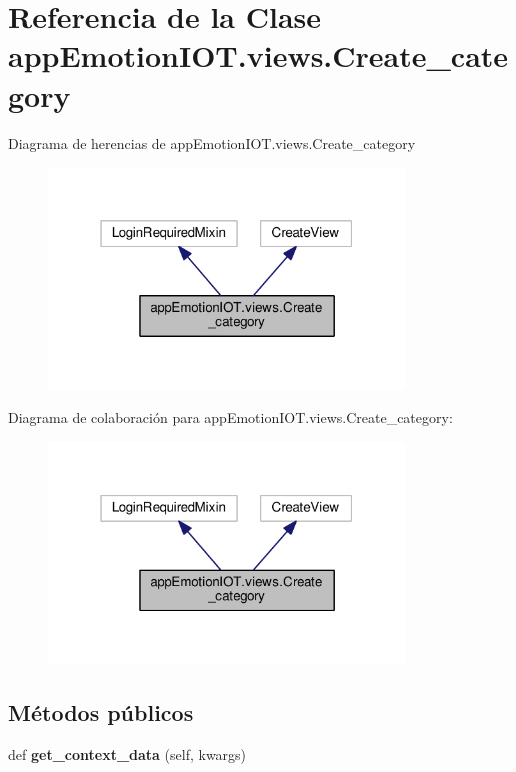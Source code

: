 \hypertarget{classappEmotionIOT_1_1views_1_1Create__category}{}\section{Referencia de la Clase app\+Emotion\+I\+O\+T.\+views.\+Create\+\_\+category}
\label{classappEmotionIOT_1_1views_1_1Create__category}


Diagrama de herencias de app\+Emotion\+I\+O\+T.\+views.\+Create\+\_\+category
\nopagebreak
\begin{figure}[H]
\begin{center}
\leavevmode
\includegraphics[width=268pt]{classappEmotionIOT_1_1views_1_1Create__category__inherit__graph}
\end{center}
\end{figure}


Diagrama de colaboración para app\+Emotion\+I\+O\+T.\+views.\+Create\+\_\+category\+:
\nopagebreak
\begin{figure}[H]
\begin{center}
\leavevmode
\includegraphics[width=268pt]{classappEmotionIOT_1_1views_1_1Create__category__coll__graph}
\end{center}
\end{figure}
\subsection*{Métodos públicos}
\begin{DoxyCompactItemize}
\item 
def {\bfseries get\+\_\+context\+\_\+data} (self, kwargs)\hypertarget{classappEmotionIOT_1_1views_1_1Create__category_a7c6bdb6b280a720d49b3fb0e97b6f095}{}\label{classappEmotionIOT_1_1views_1_1Create__category_a7c6bdb6b280a720d49b3fb0e97b6f095}

\end{DoxyCompactItemize}
